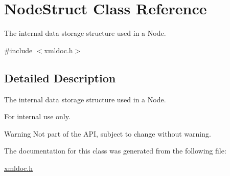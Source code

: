 \hypertarget{classNodeStruct}{
\section{NodeStruct Class Reference}
\label{d4/d18/classNodeStruct}
}


The internal data storage structure used in a Node.  




{\ttfamily \#include $<$xmldoc.h$>$}



\subsection{Detailed Description}
The internal data storage structure used in a Node. \begin{DoxyInternal}{For internal use only.}
\begin{DoxyWarning}{Warning}
Not part of the API, subject to change without warning. 
\end{DoxyWarning}
\end{DoxyInternal}


The documentation for this class was generated from the following file:\begin{DoxyCompactItemize}
\item 
\hyperlink{xmldoc_8h}{xmldoc.h}\end{DoxyCompactItemize}
